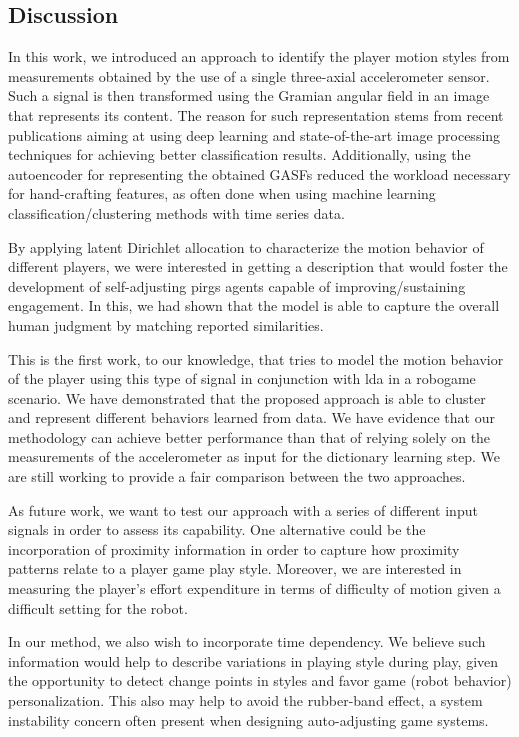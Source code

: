 {\subsection{Discussion}
In this work, we introduced an approach to identify the player motion styles from measurements obtained by the use of a single three-axial accelerometer sensor. Such a signal is then transformed using the Gramian angular field in an image that represents its content. The reason for such representation stems from recent publications aiming at using deep learning and state-of-the-art image processing techniques for achieving better classification results. Additionally, using the autoencoder for representing the obtained GASFs reduced the workload necessary for hand-crafting features, as often done when using machine learning classification/clustering methods with time series data.

By applying latent Dirichlet allocation to characterize the motion behavior of different players, we were interested in getting a description that would foster the development of self-adjusting \gls{pirg}s agents capable of improving/sustaining engagement. In this, we had shown that the model is able to capture the overall human judgment by matching reported similarities. 

This is the first work, to our knowledge, that tries to model the motion behavior of the player using this type of signal in conjunction with \gls{lda} in a robogame scenario. We have demonstrated that the proposed approach is able to cluster and represent different behaviors learned from data. We have evidence that our methodology can achieve better performance than that of relying solely on the measurements of the accelerometer as input for the dictionary learning step. We are still working to provide a fair comparison between the two approaches.%

As future work, we want to test our approach with a series of different input signals in order to assess its capability. One alternative could be the incorporation of proximity information in order to capture how proximity patterns relate to a player game play style. Moreover, we are interested in measuring the player's effort expenditure in terms of difficulty of motion given a difficult setting for the robot. 

In our method, we also wish to incorporate time dependency. We believe such information would help to describe variations in playing style during play, given the opportunity to detect change points in styles and favor game (robot behavior) personalization. This also may help to avoid the rubber-band effect, a system instability concern often present when designing auto-adjusting game systems.

}
